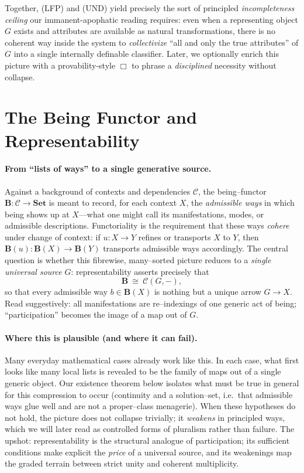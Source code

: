 \documentclass[11pt]{article}
\theoremstyle{upright}
\begin{document}
Together, (LFP) and (UND) yield precisely the sort of principled \emph{incompleteness ceiling} \citep{Goedel1931} our immanent-apophatic reading requires: even when a representing object \(G\) exists and attributes are available as natural transformations, there is no coherent way inside the system to \emph{collectivize} “all and only the true attributes” of \(G\) into a single internally definable classifier. Later, we optionally enrich this picture with a provability-style \(\Box\) to phrase a \emph{disciplined} necessity without collapse.

\section{The Being Functor and Representability}\label{sec:being}

\paragraph{From “lists of ways” to a single generative source.}
Against a background of contexts and dependencies $\mathcal C$, the being–functor 
$\mathbf B:\mathcal C\to\mathbf{Set}$ is meant to record, for each context $X$, the \emph{admissible ways} in which being shows up at $X$—what one might call its manifestations, modes, or admissible descriptions. Functoriality is the requirement that these ways \emph{cohere} under change of context: if $u:X\to Y$ refines or transports $X$ to $Y$, then $\mathbf B(u):\mathbf B(X)\to\mathbf B(Y)$ transports admissible ways accordingly. The central question is whether this fibrewise, many–sorted picture reduces to a \emph{single universal source} $G$: representability asserts precisely that
\[
\mathbf B\ \cong\ \mathcal C(G,-),
\]
so that every admissible way $b\in\mathbf B(X)$ is nothing but a unique arrow $G\to X$. Read suggestively: all manifestations are re–indexings of one generic act of being; “participation” becomes the image of a map out of $G$.

\paragraph{Where this is plausible (and where it can fail).}
Many everyday mathematical cases already work like this. In each case, what first looks like many local lists is revealed to be the family of maps out of a single generic object. Our existence theorem below isolates what must be true in general for this compression to occur (continuity and a solution–set, i.e.\ that admissible ways glue well and are not a proper–class menagerie). When these hypotheses do not hold, the picture does not collapse trivially; it \emph{weakens} in principled ways, which we will later read as controlled forms of pluralism rather than failure. The upshot: representability is the structural analogue of participation; its sufficient conditions make explicit the \emph{price} of a universal source, and its weakenings map the graded terrain between strict unity and coherent multiplicity.
\end{document}
